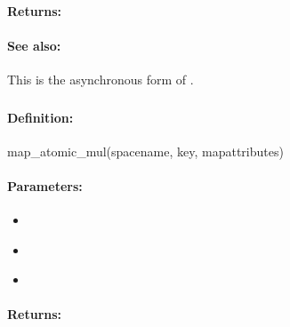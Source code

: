 \paragraph{Returns:}


\paragraph{See also:}  This is the asynchronous form of .

\pagebreak
\subsubsection{}
\label{api:ruby:map_atomic_mul}


\paragraph{Definition:}
\begin{rubycode}
map_atomic_mul(spacename, key, mapattributes)
\end{rubycode}

\paragraph{Parameters:}
\begin{itemize}[noitemsep]
\item {}\\

\item {}\\

\item {}\\

\end{itemize}

\paragraph{Returns:}


\pagebreak
\subsubsection{}
\label{api:ruby:async_map_atomic_mul}



